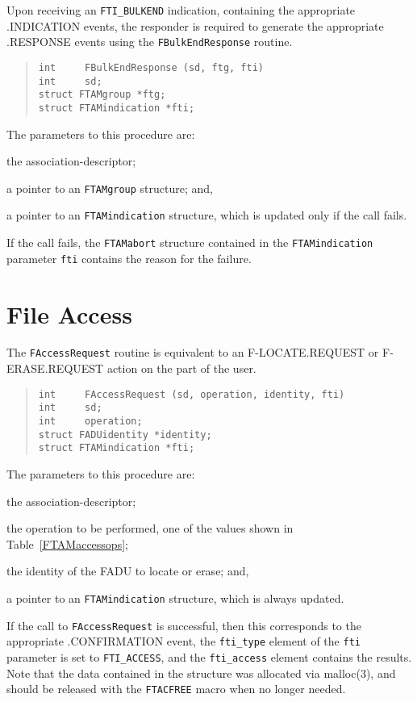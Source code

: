 Upon receiving an \verb"FTI_BULKEND" indication,
containing the appropriate {\sf .INDICATION\/} events,
the responder is required to generate the appropriate {\sf .RESPONSE\/}
events using the \verb"FBulkEndResponse" routine.
\begin{quote}\small\begin{verbatim}
int     FBulkEndResponse (sd, ftg, fti)
int     sd;
struct FTAMgroup *ftg;
struct FTAMindication *fti;
\end{verbatim}\end{quote}
The parameters to this procedure are:
\begin{describe}
\item[\verb"sd":] the association-descriptor;

\item[\verb"ftg":] a pointer to an \verb"FTAMgroup" structure;
and,

\item[\verb"fti":] a pointer to an \verb"FTAMindication" structure, which is
updated only if the call fails.
\end{describe}
If the call fails,
the \verb"FTAMabort" structure contained in the
\verb"FTAMindication" parameter \verb"fti" contains the reason for the failure.

\section	{File Access}
The \verb"FAccessRequest" routine is equivalent to an {\sf F-LOCATE.REQUEST\/}
or {\sf F-ERASE.REQUEST\/} action on the part of the user.
\begin{quote}\small\begin{verbatim}
int     FAccessRequest (sd, operation, identity, fti)
int     sd;
int     operation;
struct FADUidentity *identity;
struct FTAMindication *fti;
\end{verbatim}\end{quote}
The parameters to this procedure are:
\begin{describe}
\item[\verb"sd":] the association-descriptor;

\item[\verb"operation":] the operation to be performed,
one of the values shown in Table~\ref{FTAMaccessops};

\item[\verb"identity":] the identity of the FADU to locate or erase;
and,

\item[\verb"fti":] a pointer to an \verb"FTAMindication" structure, which is
always updated.
\end{describe}
If the call to \verb"FAccessRequest" is successful,
then this corresponds to the appropriate {\sf .CONFIRMATION\/} event,
the \verb"fti_type" element of the \verb"fti" parameter is set to
\verb"FTI_ACCESS",
and the \verb"fti_access" element contains the results.
Note that the data contained in the structure was allocated via \man malloc(3),
and should be released with the \verb"FTACFREE" macro when no longer needed.

